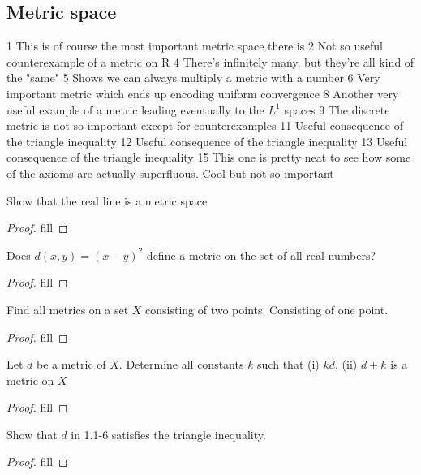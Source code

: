 \subsection{Metric space}

1 This is of course the most important metric space there is
2 Not so useful counterexample of a metric on R
4 There's infinitely many, but they're all kind of the "same"
5 Shows we can always multiply a metric with a number
6 Very important metric which ends up encoding uniform convergence 
8 Another very useful example of a metric leading eventually to the $L^1$ spaces 
9 The discrete metric is not so important except for counterexamples
11 Useful consequence of the triangle inequality
12 Useful consequence of the triangle inequality
13 Useful consequence of the triangle inequality
15 This one is pretty neat to see how some of the axioms are actually superfluous. Cool but not so important

\begin{exercise}{1}
Show that the real line is a metric space
\end{exercise}
\begin{proof}
fill
\end{proof}

\begin{exercise}{2}
Does $d(x,y)=(x-y)^2$ define a metric on the set of all real numbers?
\end{exercise}
\begin{proof}
fill
\end{proof}

\begin{exercise}{4}
Find all metrics on a set $X$ consisting of two points. Consisting of one point.
\end{exercise}
\begin{proof}
fill
\end{proof}

\begin{exercise}{5}
Let $d$ be a metric of $X$. Determine all constants $k$ such that (i) $kd$, (ii) $d+k$ is a metric on $X$
\end{exercise}
\begin{proof}
fill
\end{proof}

\begin{exercise}{6}
Show that $d$ in 1.1-6 satisfies the triangle inequality.
\end{exercise}
\begin{proof}
fill
\end{proof}


